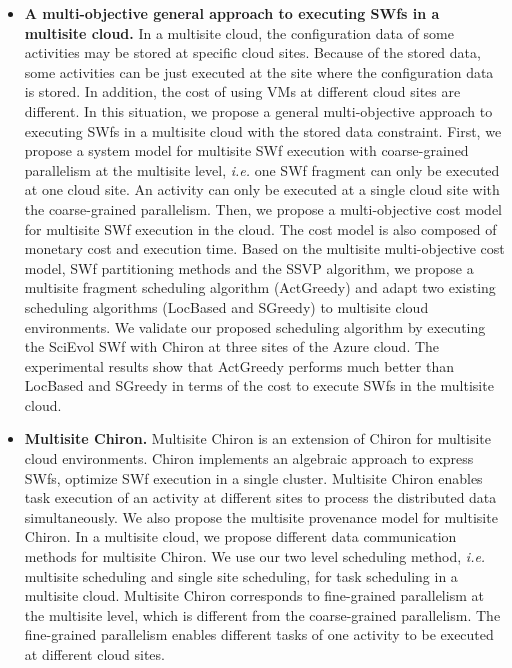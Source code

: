 \begin{itemize}
\item \textbf{A multi-objective general approach to executing SWfs in a multisite cloud.} In a multisite cloud, the configuration data of some activities may be stored at specific cloud sites. Because of the stored data, some activities can be just executed at the site where the configuration data is stored. In addition, the cost of using VMs at different cloud sites are different. In this situation, we propose a general multi-objective approach to executing SWfs in a multisite cloud with the stored data constraint. First, we propose a system model for multisite SWf execution with coarse-grained parallelism at the multisite level, \textit{i.e.} one SWf fragment can only be executed at one cloud site.
An activity can only be executed at a single cloud site with the coarse-grained parallelism. Then, we propose a multi-objective cost model for multisite SWf execution in the cloud. The cost model is also composed of monetary cost and execution time. Based on the multisite multi-objective cost model, SWf partitioning methods and the SSVP algorithm, we propose a multisite fragment scheduling algorithm (ActGreedy) and adapt two existing scheduling algorithms (LocBased and SGreedy) to multisite cloud environments. We validate our proposed scheduling algorithm by executing the SciEvol SWf with Chiron at three sites of the Azure cloud. The experimental results show that ActGreedy performs much better than LocBased and SGreedy in terms of the cost to execute SWfs in the multisite cloud. 

\item \textbf{Multisite Chiron.} Multisite Chiron is an extension of Chiron for multisite cloud environments. Chiron implements an algebraic approach to express SWfs, optimize SWf execution in a single cluster. Multisite Chiron enables task execution of an activity at different sites to process the distributed data simultaneously. We also propose the multisite provenance model for multisite Chiron. In a multisite cloud, we propose different data communication methods for multisite Chiron. We use our two level scheduling method, \textit{i.e.} multisite scheduling and single site scheduling, for task scheduling in a multisite cloud.  Multisite Chiron corresponds to fine-grained parallelism at the multisite level, which is different from the coarse-grained parallelism. The fine-grained parallelism enables different tasks of one activity to be executed at different cloud sites.


\end{itemize}
